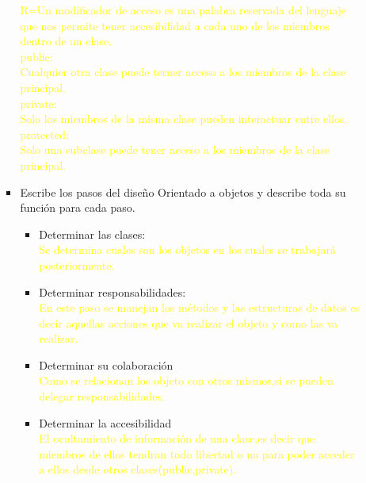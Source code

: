 \documentclass[a4paper,10pt]{article}
\begin{document}
\begin{enumerate}
\begin{enumerate}
\begin{itemize}
                   \textcolor{yellow}{R=Un modificador de acceso es una palabra reservada del lenguaje que nos permite tener accesibilidad a cada uno de los miembros dentro de un clase.\\
                   \textcolor{blue-green}{public:\\}Cualquier otra clase puede terner acceso a los miembros de la clase principal.\\
                   \textcolor{blue-green}{private:\\}Solo los miembros de la misma clase pueden interactuar entre ellos.\\
                   \textcolor{blue-green}{protected:}\\ Solo una subclase puede tener acceso a los miembros de la clase principal.} 
            \item Escribe los pasos del diseño Orientado a objetos y describe toda su función para cada paso.
            
                    \renewcommand{\labelitemi}{\ding{42}}
                    \renewcommand{\labelitemii}{\ding{43}} 
                  \begin{itemize}
                      \item \textcolor{blue-green}{Determinar las clases:}\\\textcolor{yellow}{Se determina cuales son los objetos en los cuales se trabajará posteriormente.}
                      \item \textcolor{blue-green}{Determinar responsabilidades:}\\\textcolor{yellow}{En este paso se manejan los métodos y las estructuras de datos es decir aquellas acciones que va realizar el objeto y como las va realizar.}
                      \item \textcolor{blue-green}{Determinar su colaboración}\\\textcolor{yellow}{Como se relacionan los objeto con otros mismos,si se pueden delegar responsabilidades.}
                      \item \textcolor{blue-green}{Determinar la accesibilidad}\\\textcolor{yellow}{El ocultamiento de información de una clase,es decir que miembros de ellos tendran todo libertad o no para poder acceder a ellos desde otros clases(public,private).}
                  \end{itemize}              


        \end{itemize}
    \end{enumerate}
\newpage


\end{enumerate}
\end{document}
